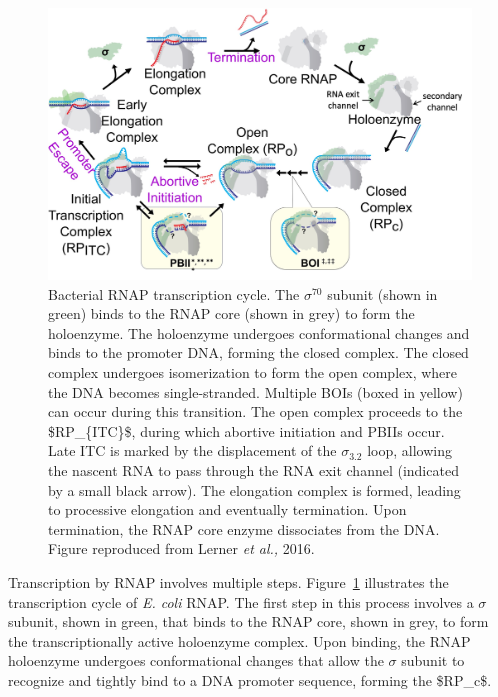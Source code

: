 \begin{figure}
    \centering
    \includegraphics[width=\textwidth]{chapters/figures/transcription_initiation.jpg}
    \caption{\label{fig:transcription_cycle}Bacterial RNAP transcription cycle. 
    The $\sigma^{70}$ subunit (shown in green) binds to the RNAP core (shown in grey) to form the holoenzyme. 
    The holoenzyme undergoes conformational changes and binds to the promoter DNA, forming the closed complex. 
    The closed complex undergoes isomerization to form the open complex, where the DNA becomes single-stranded. Multiple \ac{BOIs} (boxed in yellow) can occur during this transition. 
    The open complex proceeds to the \ac{$RP_{ITC}$}, during which abortive initiation and \ac{PBIIs} occur. 
    Late ITC is marked by the displacement of the $\sigma_{3.2}$ loop, allowing the nascent RNA to pass through the RNA exit channel (indicated by a small black arrow).
    The elongation complex is formed, leading to processive elongation and eventually termination. 
    Upon termination, the RNAP core enzyme dissociates from the DNA.
    Figure reproduced from Lerner \textit{et al.,} 2016.~\cite{lerner_PNAS_2016}}
\end{figure}

Transcription by RNAP involves multiple steps. 
Figure~\ref{fig:transcription_cycle} illustrates the transcription cycle of \textit{\ac{E. coli}} RNAP. 
The first step in this process involves a $\sigma$ subunit, shown in green, that binds to the RNAP core, shown in grey, to form the transcriptionally active holoenzyme complex.
Upon binding, the RNAP holoenzyme undergoes conformational changes that allow the $\sigma$ subunit to recognize and tightly bind to a DNA promoter sequence, forming the \ac{$RP_c$}. 

